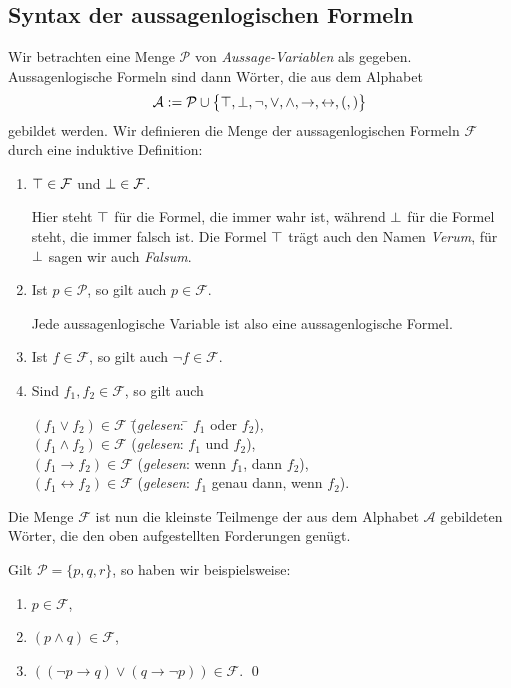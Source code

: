 \subsection{Syntax der aussagenlogischen Formeln}
Wir betrachten eine Menge $\mathcal{P}$ von  \emph{Aussage-Variablen} als gegeben.
Aussagenlogische Formeln sind dann W\"{o}rter, die aus dem Alphabet
\[ \mathcal{A} := \mathcal{P} \cup \bigl\{ \top, \bot, \neg, \vee, \wedge,
   \rightarrow, \leftrightarrow, (, ) \bigr\}
\]
gebildet werden.  Wir definieren die Menge der aussagenlogischen Formeln
$\mathcal{F}$ durch eine induktive Definition:
\begin{enumerate}
\item $\top \in \mathcal{F}$ und $\mathtt{\bot} \in \mathcal{F}$.

      Hier steht $\top$ f\"{u}r die Formel, die immer wahr ist, w\"{a}hrend $\bot$ f\"{u}r die 
      Formel steht, die immer falsch ist.  Die Formel $\top$ tr\"{a}gt auch den Namen \textsl{Verum},
      f\"{u}r $\bot$ sagen wir auch \textsl{Falsum}.
\item Ist $p \in \mathcal{P}$, so gilt auch $p \in \mathcal{F}$.

      Jede aussagenlogische Variable ist also eine aussagenlogische Formel.
\item Ist $f \in \mathcal{F}$, so gilt auch $\neg f \in \mathcal{F}$.
\item Sind $f_1, f_2 \in \mathcal{F}$, so gilt auch
      \begin{tabbing}
        $(f_1 \vee f_2) \in \mathcal{F}$ \hspace*{0.5cm} \= (\textsl{gelesen}: \quad \= $f_1$ oder $f_2$),            \\
        $(f_1 \wedge f_2) \in \mathcal{F}$                 \> (\textsl{gelesen}:       \> $f_1$ und $f_2$),             \\
        $(f_1 \rightarrow f_2) \in \mathcal{F}$                \> (\textsl{gelesen}:       \> wenn $f_1$, dann $f_2$),      \\
        $(f_1 \leftrightarrow f_2) \in \mathcal{F}$                \> (\textsl{gelesen}:       \> $f_1$ genau dann, wenn $f_2$).
      \end{tabbing}
\end{enumerate}
Die Menge $\mathcal{F}$ ist nun die kleinste Teilmenge der aus dem Alphabet $\mathcal{A}$
gebildeten W\"{o}rter, die den oben aufgestellten Forderungen gen\"{u}gt.

\example 
Gilt $\mathcal{P} = \{ p, q, r \}$, so haben wir beispielsweise:
\begin{enumerate}
\item $p \in \mathcal{F}$,
\item $(p \wedge q) \in \mathcal{F}$,
\item $((\neg p \rightarrow q) \vee (q \rightarrow \neg p)) \in \mathcal{F}$.  \qed
\end{enumerate}

